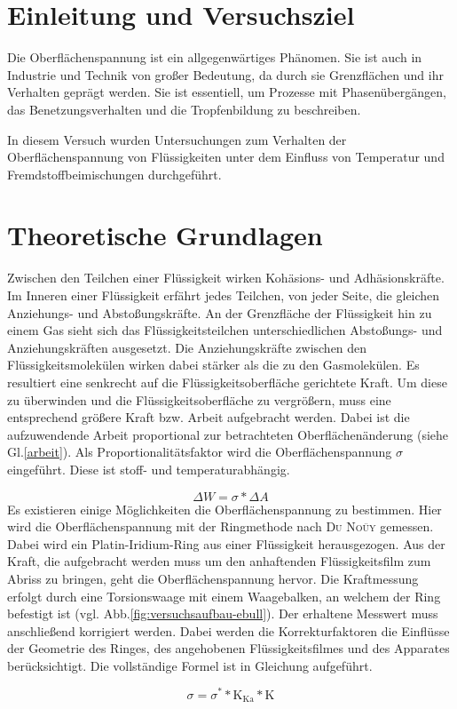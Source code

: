 \section{Einleitung und Versuchsziel}
\label{sec:aufgabenstellung}
Die Oberflächenspannung ist ein allgegenwärtiges Phänomen. Sie ist auch in Industrie und Technik von großer Bedeutung, da  durch sie Grenzflächen und ihr Verhalten geprägt werden. Sie ist essentiell, um Prozesse mit Phasenübergängen, das Benetzungsverhalten und die Tropfenbildung zu beschreiben.

In diesem Versuch wurden Untersuchungen zum Verhalten der Oberflächenspannung von Flüssigkeiten unter dem Einfluss von Temperatur und Fremdstoffbeimischungen durchgeführt. 

\section{Theoretische Grundlagen}

Zwischen den Teilchen einer Flüssigkeit wirken Kohäsions- und Adhäsionskräfte. Im Inneren einer Flüssigkeit erfährt jedes Teilchen, von jeder Seite, die gleichen Anziehungs- und Abstoßungskräfte. An der Grenzfläche der Flüssigkeit hin zu einem Gas sieht sich das Flüssigkeitsteilchen unterschiedlichen Abstoßungs- und Anziehungskräften ausgesetzt. Die Anziehungskräfte zwischen den Flüssigkeitsmolekülen wirken dabei stärker als die zu den Gasmolekülen. Es resultiert eine senkrecht auf die Flüssigkeitsoberfläche gerichtete Kraft. Um diese zu überwinden und die Flüssigkeitsoberfläche zu vergrößern, muss eine entsprechend größere Kraft bzw. Arbeit aufgebracht werden. Dabei ist die aufzuwendende Arbeit proportional zur betrachteten Oberflächenänderung (siehe Gl.\eqref{arbeit}). Als Proportionalitätsfaktor wird die Oberflächenspannung $\sigma$ eingeführt. Diese ist stoff- und temperaturabhängig. 

\begin{equation}\label{arbeit}
	\Delta W=\sigma*\Delta A
\end{equation}
Es existieren einige Möglichkeiten die Oberflächenspannung zu bestimmen. Hier wird die Oberflächenspannung mit der Ringmethode nach \textsc{Du Noüy} gemessen. Dabei wird ein Platin-Iridium-Ring aus einer Flüssigkeit herausgezogen. Aus der Kraft, die aufgebracht werden muss um den anhaftenden Flüssigkeitsfilm zum Abriss zu bringen, geht die Oberflächenspannung hervor. Die Kraftmessung erfolgt durch eine Torsionswaage mit einem Waagebalken, an welchem der Ring befestigt ist (vgl. Abb.\ref{fig:versuchsaufbau-ebull}). Der erhaltene Messwert muss anschließend korrigiert werden. Dabei werden die Korrekturfaktoren die Einflüsse der Geometrie des Ringes, des angehobenen Flüssigkeitsfilmes und des Apparates berücksichtigt. Die vollständige Formel ist in Gleichung aufgeführt.

\begin{equation}
	\sigma=\sigma^\ast*\text{K}_{\text{Ka}}*\text{K}
\end{equation}


